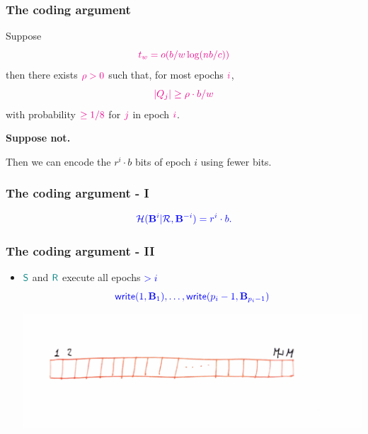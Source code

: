 \documentclass[]{beamer}
\newcommand{\Sender}{\color{teal} \mathsf{S}}
\newcommand{\Receiver}{\color{teal} \mathsf{R}}
\newcommand{\calR}{\mathcal{R}}
\newcommand{\wri}{\mathsf{write}}
\newcommand{\bB}{\mathbf{B}}
\begin{document}
\begin{frame}
\frametitle{The coding argument}

\color{blue}
Suppose 
$$\color{magenta} t_w=o(b/w\log (nb/c))$$
then there exists $\color{magenta}\rho>0$ such that, for most 
epochs $\color{magenta}i$,
$$\color{magenta} |Q_j|\geq \rho\cdot b/w$$
with probability $\color{magenta}\geq 1/8$ for $\color{magenta} j$ in epoch 
$\color{magenta}i$. 

\pause

\vfill
{\bf Suppose not.}

\pause

Then we can encode the $r^i\cdot b$ bits of epoch $i$ using fewer bits.

\end{frame}
\begin{frame}

\frametitle{The coding argument - I}

\vfill


\vfill
\vfill

$$\color{blue} {\cal{H}}(\bB^i|\calR, \bB^{-i})=r^i\cdot b.$$

\end{frame}

\begin{frame}
\frametitle{The coding argument - II}
\begin{itemize}
\item $\Sender$ and $\Receiver$ execute all epochs $\color{blue} >i$
$$\color{blue}\wri(1,\bB_1),\ldots,\wri(p_i-1,\bB_{p_i-1})$$


\begin{center}
\includegraphics[width=\textwidth]{Images/memory01.pdf}
\end{center}
\end{itemize}
\end{frame}
\end{document}
